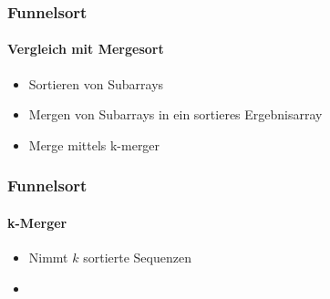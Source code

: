 \documentclass{beamer}
\begin{document}
\begin{frame}
  \frametitle{Funnelsort}
  \framesubtitle{Vergleich mit Mergesort}
  \begin{itemize}
    \item Sortieren von Subarrays
    \item Mergen von Subarrays in ein sortieres Ergebnisarray
  \end{itemize}
  \begin{itemize}
    \item Merge mittels k-merger
  \end{itemize}
\end{frame}

\begin{frame}
  \frametitle{Funnelsort}
  \framesubtitle{k-Merger}
  \begin{itemize}
    \item Nimmt $k$ sortierte Sequenzen
    \item 
  \end{itemize}
\end{frame}
\end{document}
